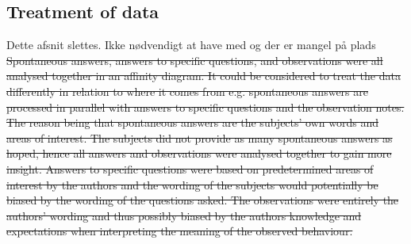 \subsection{Treatment of data}
{\color{red} Dette afsnit slettes. Ikke nødvendigt at have med og der er mangel på plads}
\sout{Spontaneous answers, answers to specific questions, and observations were all analysed together in an affinity diagram. It could be considered to treat the data differently in relation to where it comes from e.g. spontaneous answers are processed in parallel with answers to specific questions and the observation notes. The reason being that spontaneous answers are the subjects' own words and areas of interest. The subjects did not provide as many spontaneous answers as hoped, hence all answers and observations were analysed together to gain more insight. Answers to specific questions were based on predetermined areas of interest by the authors and the wording of the subjects would potentially be biased by the wording of the questions asked. The observations were entirely the authors' wording and thus possibly biased by the authors knowledge and expectations when interpreting the meaning of the observed behaviour.}